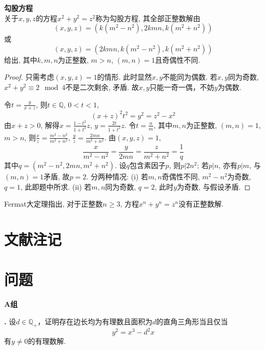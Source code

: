 \begin{pro} \textbf{勾股方程}\\
关于$x,y,z$的方程$x^2+y^2=z^2$称为勾股方程, 其全部正整数解由
\begin{equation}
(x,y,z)=(k(m^2-n^2), 2kmn, k(m^2+n^2))
\end{equation}
或
\begin{equation}
(x,y,z)=(2kmn, k(m^2-n^2), k(m^2+n^2))
\end{equation}
给出, 其中$k,m,n$为正整数, $m>n$, $(m,n)=1$且奇偶性不同. 
\end{pro}
\begin{proof}
只需考虑$(x,y,z)=1$的情形. 此时显然$x,y$不能同为偶数. 若$x,y$同为奇数, $x^2+y^2\equiv 2 \mod 4$不是二次剩余, 矛盾. 故$x,y$只能一奇一偶，不妨$y$为偶数. 

令$t=\frac{y}{x+z}$, 则$t\in \mathbb{Q}$, $0<t<1$, 
\begin{equation*}
    (x+z)^2 t^2=y^2=z^2-x^2
\end{equation*}
由$x+z>0$, 解得$x=\frac{1-t^2}{1+t^2}z$, $y=\frac{2t}{1+t^2}z$. 令$t=\frac{n}{m}$, 其中$m,n$为正整数, $(m,n)=1$, $m>n$, 则$\frac{x}{z}=\frac{m^2-n^2}{m^2+n^2}$, $\frac{y}{z}=\frac{2mn}{m^2+n^2}$. 由$(x,y,z)=1$, 
\begin{equation*}
    \frac{x}{m^2-n^2} = \frac{y}{2mn} = \frac{z}{m^2+n^2} = \frac{1}{q}
\end{equation*}
其中$q=(m^2-n^2, 2mn, m^2+n^2)$. 设$q$包含素因子$p$, 则$p|2n^2$; 若$p|n$, 亦有$p|m$, 与$(m,n)=1$矛盾, 故$p=2$. 分两种情况: 
(i) 若$m,n$奇偶性不同, $m^2-n^2$为奇数, $q=1$, 此即题中所求. (ii) 若$m,n$同为奇数, $q=2$, 此时$y$为奇数, 与假设矛盾. 
\end{proof}

\par Fermat大定理指出, 对于正整数$n\ge 3$, 方程$x^n+y^n=z^n$没有正整数解. 

\section*{文献注记}

\section*{问题}
\par \textbf{A组}
\par \textbf{\theprobdio .} \cite{MiP} 设$d\in \mathbb{Q}_+$，证明存在边长均为有理数且面积为$d$的直角三角形当且仅当
\begin{equation}
    y^2=x^3-d^2x
\end{equation}
有$y\neq 0$的有理数解. 

